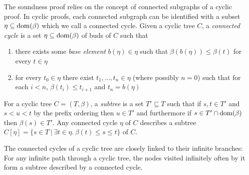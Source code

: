
The soundness proof relies on the concept of connected subgraphs of a cyclic
proof. In cyclic proofs, each connected subgraph can be
identified with a subset $\eta \subseteq \mathrm{dom}(\beta)$ which we call a connected
cycle.
Given a cyclic tree $C$, a \emph{connected cycle} is a
set $\eta \subseteq \mathrm{dom}(\beta)$ of buds of
$C$ such that
\begin{enumerate}[label=(\roman*)]
\item there exists some \emph{base element} $b(\eta) \in \eta$ such that $\beta(b(\eta)) \leq \beta(t)$ for
  every $t \in \eta$
\item for every $t_0 \in \eta$ there exist $t_1, \ldots, t_n \in \eta$ (where possibly
  $n = 0$) such that for each $i < n$, $\beta(t_i) \leq t_{i + 1}$ and $t_n = b(\eta)$
\end{enumerate}
For a cyclic tree $C = (T, \beta)$, a \emph{subtree} is a set $T' \subseteq T$
such that if $s, t \in T'$ and $s < u < t$ by the prefix ordering then $u \in
T'$ and furthermore if $s \in T' \cap \mathrm{dom}(\beta)$ then $\beta(s) \in T'$.
Any connected cycle $\eta$ of $C$ describes a subtree $C[\eta] = \{s \in T ~|~
\exists t \in \eta.~\beta(t) \leq s \leq t\}$ of $C$.

The connected cycles of a cyclic tree are closely linked to their infinite
branches: For any infinite path through a cyclic tree, the nodes visited
infinitely often by it form a subtree described by a connected cycle.

